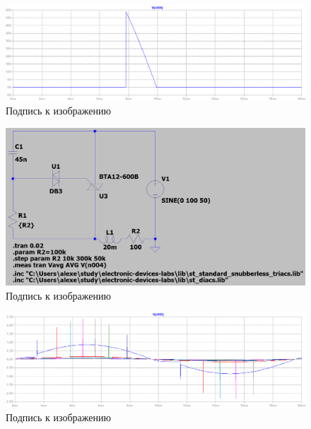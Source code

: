 \documentclass[a4paper, 12pt]{article}
\begin{document}
    \begin{figure}[H]
        \centering
        \includegraphics[scale=0.45]{R2-300k.png}
        \captionsetup{skip=0pt}
        \caption{Подпись к изображению}
        \label{fig:R2-300k}
    \end{figure}


    \begin{figure}[H]
        \centering
        \includegraphics[scale=0.3]{scheme5.png}
        \captionsetup{skip=0pt}
        \caption{Подпись к изображению}
        \label{fig:scheme5}
    \end{figure}


    \begin{figure}[H]
        \centering
        \includegraphics[scale=0.45]{R2-all_L20m.png}
        \captionsetup{skip=0pt}
        \caption{Подпись к изображению}
        \label{fig:R2-all_L20m}
    \end{figure}
\end{document}
